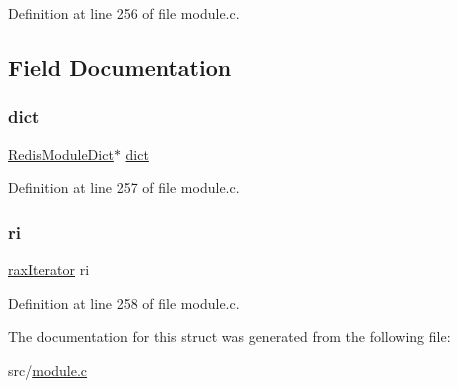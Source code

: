 Definition at line 256 of file module.\+c.



\subsection{Field Documentation}
\mbox{\label{struct_redis_module_dict_iter_a893664b6557501272c352ca1fce43d84}} 
\subsubsection{\texorpdfstring{dict}{dict}}
{\footnotesize\ttfamily \hyperlink{struct_redis_module_dict}{Redis\+Module\+Dict}$\ast$ \hyperlink{structdict}{dict}}



Definition at line 257 of file module.\+c.

\mbox{\label{struct_redis_module_dict_iter_abe7bb9f1992cb1fb3c1ecb28c13772a4}} 
\subsubsection{\texorpdfstring{ri}{ri}}
{\footnotesize\ttfamily \hyperlink{structrax_iterator}{rax\+Iterator} ri}



Definition at line 258 of file module.\+c.



The documentation for this struct was generated from the following file\+:\begin{DoxyCompactItemize}
\item 
src/\hyperlink{module_8c}{module.\+c}\end{DoxyCompactItemize}
